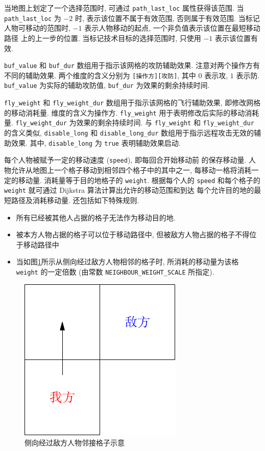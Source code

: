 \documentclass[UTF8, zihao=-4]{ctexart} %
\newcommand{\lcode}{\lstinline} % 段内插入代码
\begin{document}
当地图上划定了一个选择范围时, 可通过 \lcode{path_last_loc} 属性获得该范围. 
当 \lcode{path_last_loc} 为 $-2$ 时, 表示该位置不属于有效范围, 否则属于有效范围.  
当标记人物可移动的范围时, $-1$ 表示人物移动的起点, 一个非负值表示该位置在最短移动路径
上的上一步的位置. 当标记技术目标的选择范围时, 只使用 $-1$ 表示该位置有效.

\lcode{buf_value} 和 \lcode{buf_dur} 数组用于指示该网格的攻防辅助效果. 
注意对两个操作方有不同的辅助效果.
两个维度的含义分别为 \lcode{[操作方][攻防]}, 其中 $0$ 表示攻, $1$ 表示防.
\lcode{buf_value} 为实际的辅助攻防值, \lcode{buf_dur} 为效果的剩余持续时间.

\lcode{fly_weight} 和 \lcode{fly_weight_dur} 数组用于指示该网格的飞行辅助效果, 即修改网格的移动消耗量.
维度的含义为操作方. \lcode{fly_weight} 用于表明修改后实际的移动消耗量. \lcode{fly_weight_dur} 为效果的剩余持续时间.
与 \lcode{fly_weight} 和 \lcode{fly_weight_dur} 的含义类似, \lcode{disable_long} 和 \lcode{disable_long_dur} 
数组用于指示远程攻击无效的辅助效果. 其中, \lcode{disable_long} 为 \lcode{true} 表明辅助效果启动.

每个人物被赋予一定的移动速度 (\lcode{speed}), 即每回合开始移动前
的保存移动量. 人物允许从地图上一个格子移动到相邻四个格子中的其中之一, 每移动一格将消耗一定的移动量. 消耗量等于目的地格子的
\lcode{weight}. 根据每个人的 \lcode{speed} 和每个格子的 \lcode{weight} 就可通过 Dijkstra 算法计算出允许的移动范围和到达
每个允许目的地的最短路径及消耗移动量. 还包括如下特殊规则.
\begin{itemize}
      \item 所有已经被其他人占据的格子无法作为移动目的地.
      \item 被本方人物占据的格子可以位于移动路径中, 但被敌方人物占据的格子不得位于移动路径中
      \item 当如图\ref{f_go_by}所示从侧向经过敌方人物相邻的格子时, 所消耗的移动量为该格 \lcode{weight} 的一定倍数 
            (由常数 \lcode{NEIGHBOUR_WEIGHT_SCALE} 所指定).
\end{itemize}
\begin{figure}
      \begin{center}
            \includegraphics[scale=1]{go_by.pdf}
      \end{center}
      \caption{\label{f_go_by}侧向经过敌方人物邻接格子示意}
\end{figure}
\end{document}
